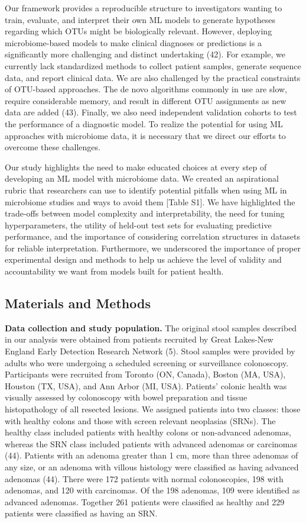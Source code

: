 \documentclass[11pt,]{article}
\begin{document}
Our framework provides a reproducible structure to investigators wanting
to train, evaluate, and interpret their own ML models to generate
hypotheses regarding which OTUs might be biologically relevant. However,
deploying microbiome-based models to make clinical diagnoses or
predictions is a significantly more challenging and distinct undertaking
(42). For example, we currently lack standardized methods to collect
patient samples, generate sequence data, and report clinical data. We
are also challenged by the practical constraints of OTU-based
approaches. The de novo algorithms commonly in use are slow, require
considerable memory, and result in different OTU assignments as new data
are added (43). Finally, we also need independent validation cohorts to
test the performance of a diagnostic model. To realize the potential for
using ML approaches with microbiome data, it is necessary that we direct
our efforts to overcome these challenges.

Our study highlights the need to make educated choices at every step of
developing an ML model with microbiome data. We created an aspirational
rubric that researchers can use to identify potential pitfalls when
using ML in microbiome studies and ways to avoid them {[}Table S1{]}. We
have highlighted the trade-offs between model complexity and
interpretability, the need for tuning hyperparameters, the utility of
held-out test sets for evaluating predictive performance, and the
importance of considering correlation structures in datasets for
reliable interpretation. Furthermore, we underscored the importance of
proper experimental design and methods to help us achieve the level of
validity and accountability we want from models built for patient
health.

\subsection{Materials and Methods}\label{materials-and-methods}

\textbf{Data collection and study population.} The original stool
samples described in our analysis were obtained from patients recruited
by Great Lakes-New England Early Detection Research Network (5). Stool
samples were provided by adults who were undergoing a scheduled
screening or surveillance colonoscopy. Participants were recruited from
Toronto (ON, Canada), Boston (MA, USA), Houston (TX, USA), and Ann Arbor
(MI, USA). Patients' colonic health was visually assessed by colonoscopy
with bowel preparation and tissue histopathology of all resected
lesions. We assigned patients into two classes: those with healthy
colons and those with screen relevant neoplasias (SRNs). The healthy
class included patients with healthy colons or non-advanced adenomas,
whereas the SRN class included patients with advanced adenomas or
carcinomas (44). Patients with an adenoma greater than 1 cm, more than
three adenomas of any size, or an adenoma with villous histology were
classified as having advanced adenomas (44). There were 172 patients
with normal colonoscopies, 198 with adenomas, and 120 with carcinomas.
Of the 198 adenomas, 109 were identified as advanced adenomas. Together
261 patients were classified as healthy and 229 patients were classified
as having an SRN.
\end{document}
